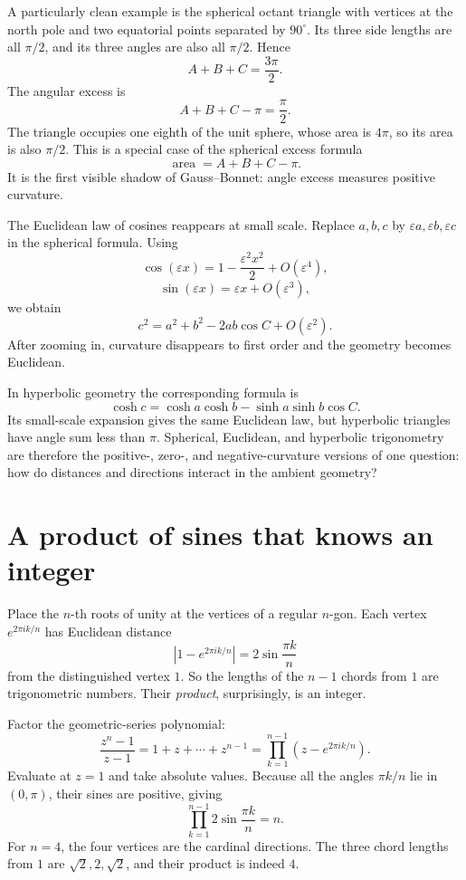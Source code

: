 A particularly clean example is the spherical octant triangle with vertices at the north pole and two equatorial points separated by \(90^\circ\).  Its three side lengths are all \(\pi/2\), and its three angles are also all \(\pi/2\).  Hence
\[
  A+B+C=\frac{3\pi}{2}.
\]
The angular excess is
\[
  A+B+C-\pi=\frac\pi2.
\]
The triangle occupies one eighth of the unit sphere, whose area is \(4\pi\), so its area is also \(\pi/2\).  This is a special case of the spherical excess formula
\[
  \operatorname{area}=A+B+C-\pi.
\]
It is the first visible shadow of Gauss--Bonnet: angle excess measures positive curvature.

The Euclidean law of cosines reappears at small scale.  Replace \(a,b,c\) by \(\varepsilon a,\varepsilon b,\varepsilon c\) in the spherical formula.  Using
\[
  \cos(\varepsilon x)
  =1-\frac{\varepsilon^2x^2}{2}+O(\varepsilon^4),
\]
\[
  \sin(\varepsilon x)
  =\varepsilon x+O(\varepsilon^3),
\]
we obtain
\[
  c^2=a^2+b^2-2ab\cos C+O(\varepsilon^2).
\]
After zooming in, curvature disappears to first order and the geometry becomes Euclidean.

In hyperbolic geometry the corresponding formula is
\[
  \cosh c
  =\cosh a\cosh b
   -\sinh a\sinh b\cos C.
\]
Its small-scale expansion gives the same Euclidean law, but hyperbolic triangles have angle sum less than \(\pi\).  Spherical, Euclidean, and hyperbolic trigonometry are therefore the positive-, zero-, and negative-curvature versions of one question: how do distances and directions interact in the ambient geometry?

\section{A product of sines that knows an integer}

Place the $n$-th roots of unity at the vertices of a regular $n$-gon. Each vertex $e^{2\pi i k/n}$ has Euclidean distance
\[
 |1-e^{2\pi i k/n}|=2\sin\frac{\pi k}{n}
\]
from the distinguished vertex $1$. So the lengths of the $n-1$ chords from $1$ are trigonometric numbers. Their \emph{product}, surprisingly, is an integer.

Factor the geometric-series polynomial:
\[
 \frac{z^n-1}{z-1}
 =1+z+\cdots+z^{n-1}
 =\prod_{k=1}^{n-1}(z-e^{2\pi i k/n}).
\]
Evaluate at $z=1$ and take absolute values. Because all the angles $\pi k/n$ lie in $(0,\pi)$, their sines are positive, giving
\[
 \boxed{\prod_{k=1}^{n-1}
    2\sin\frac{\pi k}{n}=n.}
\]
For $n=4$, the four vertices are the cardinal directions. The three chord lengths from $1$ are $\sqrt2,2,\sqrt2$, and their product is indeed $4$.

